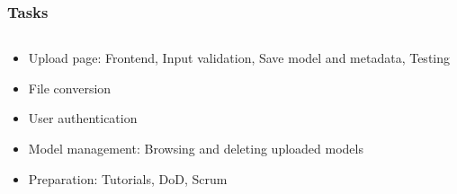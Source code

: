 \begin{frame}
  \frametitle{Tasks}
  
  \begin{columns}
    \begin{column}{0.8\textwidth}
      \begin{itemize}
        \item Upload page: Frontend, Input validation, Save model and metadata, Testing
        \item File conversion
        \item User authentication
        \item Model management: Browsing and deleting uploaded models
        \item Preparation: Tutorials, DoD, Scrum
      \end{itemize}
    \end{column}


\end{columns}
\end{frame}
